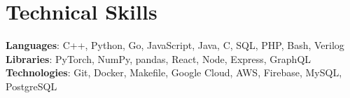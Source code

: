 \documentclass[letterpaper,11pt]{article}
\begin{document}
%
\section{Technical Skills}
 \begin{itemize}[leftmargin=0.15in, label={}]
    \small{\item{
     \textbf{Languages}{: C++, Python, Go, JavaScript, Java, C, SQL, PHP, Bash, Verilog} \\
     \textbf{Libraries}{: PyTorch, NumPy, pandas, React, Node, Express, GraphQL} \\
     \textbf{Technologies}{: Git, Docker, Makefile, Google Cloud, AWS, Firebase, MySQL, PostgreSQL}
    }}
 \end{itemize}


\end{document}
